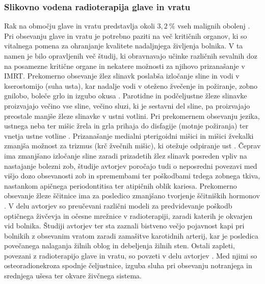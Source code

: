 \documentclass[a4paper,twoside,11pt]{article}
\begin{document}
	\subsubsection*{Slikovno vodena radioterapija glave in vratu}
	\par{
	  Rak na območju glave in vratu predstavlja okoli $3{,}2~\%$ vseh malignih obolenj \citep{torre2015}. Pri obsevanju glave in vratu je potrebno paziti na več kritičnih organov, ki so vitalnega pomena za ohranjanje kvalitete nadaljnjega življenja bolnika. V ta namen je bilo opravljenih več študij, ki obravnavajo učinke različnih sevalnih doz na posamezne kritične organe in nekatere možnosti za njihovo prizanašanje v IMRT. Prekomerno obsevanje žlez slinavk poslabša izločanje sline in vodi v kserostomijo (suha usta), kar nadalje vodi v oteženo žvečenje in požiranje, zobno gnilobo, boleče grlo in izgubo okusa \citep{bhide2009,beetz2012,marzi2012,lee2014,yuan2014,vanluijk2015,tuomikoski2015,eisbruch2009}. Parotidne in podčeljustne žleze slinavke proizvajajo večino vse sline, večino sluzi, ki je sestavni del sline, pa proizvajajo preostale manjše žleze slinavke v ustni votlini. Pri prekomernem obsevanju jezika, ustnega neba ter mišic žrela in grla prihaja do disfagije (motnje požiranja) ter vnetja ustne votline \citep{christianen2016,vanderlaan2015,dehing-oberije2010}. Prizanašanje medialni pterigoidni mišici in mišici žvekalki zmanjša možnost za trizmus (krč žvečnih mišic), ki otežuje odpiranje ust \citep{rao2016}. Čeprav ima zmanjšano izločanje sline zaradi prizadetih žlez slinavk posreden vpliv na nastajanje bolezni zob, študije avtorjev \cite{hommez2012,lieshout2014,deng2015} poročajo tudi o neposredni povezavi med višjo dozo obsevanosti zob in spremembami ter poškodbami trdega zobnega tkiva, nastankom apičnega periodontitisa ter atipičnih oblik kariesa. Prekomerno obsevanje žleze ščitnice ima za posledico zmanjšano tvorjenje ščitniških hormonov \citep{kim2014}. V delu avtorjev \cite{moiseenko2011} so preučevani različni modeli za predvidevanje poškodb optičnega živčevja in očesne mrežnice v radioterapiji, zaradi katerih je okvarjen vid bolnika. Študiji avtorjev \cite{scott2009} ter \cite{gujral2014} sta zaznali bistveno večjo pojavnost kapi pri bolnikih z obsevanim vratom zaradi zamašitve karotidnih arterij, kar je posledica povečanega nalaganja žilnih oblog in debeljenja žilnih sten. Ostali zapleti, povezani z radioterapijo glave in vratu, so povzeti v delu avtorjev \cite{wang2011}. Med njimi so osteoradionekroza spodnje čeljustnice, izguba sluha pri obsevanju notranjega in srednjega ušesa ter okvare živčnega sistema.
	}
\end{document}
